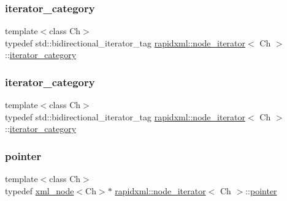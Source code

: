 \subsubsection{\texorpdfstring{iterator\+\_\+category}{iterator\_category}\hspace{0.1cm}{\footnotesize\ttfamily [1/2]}}
{\footnotesize\ttfamily template$<$class Ch$>$ \\
typedef std\+::bidirectional\+\_\+iterator\+\_\+tag \mbox{\hyperlink{classrapidxml_1_1node__iterator}{rapidxml\+::node\+\_\+iterator}}$<$ Ch $>$\+::\mbox{\hyperlink{classrapidxml_1_1node__iterator_a8e82d75f768e17bf7349d010ee26c037}{iterator\+\_\+category}}}

\mbox{\label{classrapidxml_1_1node__iterator_a8e82d75f768e17bf7349d010ee26c037}} 
\subsubsection{\texorpdfstring{iterator\+\_\+category}{iterator\_category}\hspace{0.1cm}{\footnotesize\ttfamily [2/2]}}
{\footnotesize\ttfamily template$<$class Ch$>$ \\
typedef std\+::bidirectional\+\_\+iterator\+\_\+tag \mbox{\hyperlink{classrapidxml_1_1node__iterator}{rapidxml\+::node\+\_\+iterator}}$<$ Ch $>$\+::\mbox{\hyperlink{classrapidxml_1_1node__iterator_a8e82d75f768e17bf7349d010ee26c037}{iterator\+\_\+category}}}

\mbox{\label{classrapidxml_1_1node__iterator_a65dca8bca2b9c29f635b9ad0bdeeecb9}} 
\subsubsection{\texorpdfstring{pointer}{pointer}\hspace{0.1cm}{\footnotesize\ttfamily [1/2]}}
{\footnotesize\ttfamily template$<$class Ch$>$ \\
typedef \mbox{\hyperlink{classrapidxml_1_1xml__node}{xml\+\_\+node}}$<$Ch$>$$\ast$ \mbox{\hyperlink{classrapidxml_1_1node__iterator}{rapidxml\+::node\+\_\+iterator}}$<$ Ch $>$\+::\mbox{\hyperlink{classrapidxml_1_1node__iterator_a65dca8bca2b9c29f635b9ad0bdeeecb9}{pointer}}}

